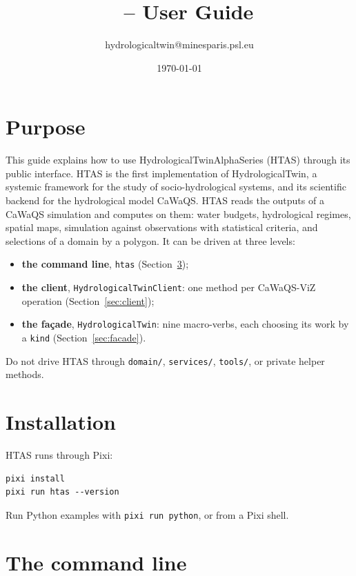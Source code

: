 \documentclass[11pt]{article}
\title{\alphaht\ \version{} -- User Guide}
\author{hydrologicaltwin@minesparis.psl.eu}
\date{\today}
\begin{document}
\maketitle

\section{Purpose}

This guide explains how to use HydrologicalTwinAlphaSeries (HTAS) through its
public interface. HTAS is the first implementation of HydrologicalTwin, a
systemic framework for the study of socio-hydrological systems, and its
scientific backend for the hydrological model CaWaQS. HTAS reads the outputs of a CaWaQS simulation and computes on
them: water budgets, hydrological regimes, spatial maps, simulation against
observations with statistical criteria, and selections of a domain by a
polygon. It can be driven at three levels:

\begin{itemize}
    \item \textbf{the command line}, \texttt{htas} (Section~\ref{sec:cli});
    \item \textbf{the client}, \texttt{HydrologicalTwinClient}: one method per
    CaWaQS-ViZ operation (Section~\ref{sec:client});
    \item \textbf{the façade}, \texttt{HydrologicalTwin}: nine macro-verbs, each
    choosing its work by a \texttt{kind} (Section~\ref{sec:facade}).
\end{itemize}

Do not drive HTAS through \texttt{domain/}, \texttt{services/},
\texttt{tools/}, or private helper methods.

\section{Installation}

HTAS runs through Pixi:

\begin{verbatim}
pixi install
pixi run htas --version
\end{verbatim}

Run Python examples with \texttt{pixi run python}, or from a Pixi shell.


\section{The command line}\label{sec:cli}
\end{document}
